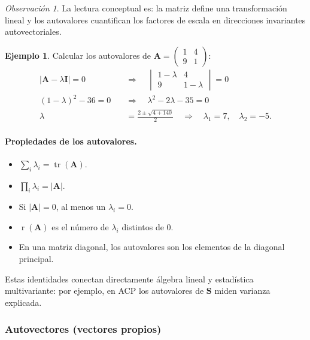 \documentclass[12pt, a4paper]{article}
\theoremstyle{plain}
\theoremstyle{definition}
\newtheorem{ejemplo}{Ejemplo}[section]
\theoremstyle{remark}
\newtheorem*{observacion}{Observación}
\newcommand{\mat}[1]{\mathbf{#1}}
\newcommand{\tr}{\operatorname{tr}}
\newcommand{\rg}{\operatorname{r}}
\begin{document}
\begin{observacion}
La lectura conceptual es: la matriz define una transformación lineal y los
autovalores cuantifican los factores de escala en direcciones invariantes
autovectoriales.
\end{observacion}

\begin{ejemplo}
Calcular los autovalores de $\mat{A} = \begin{pmatrix}1&4\\9&1\end{pmatrix}$:
\begin{align}
  |\mat{A}-\lambda\mat{I}| = 0 \quad&\Longrightarrow\quad
  \begin{vmatrix}1-\lambda & 4\\9 & 1-\lambda\end{vmatrix} = 0 \\
  (1-\lambda)^2 - 36 = 0 \quad&\Longrightarrow\quad \lambda^2 - 2\lambda - 35 = 0 \\
  \lambda &= \frac{2\pm\sqrt{4+140}}{2} \quad\Longrightarrow\quad
  \lambda_1 = 7,\quad \lambda_2 = -5.
\end{align}
\end{ejemplo}

\paragraph{Propiedades de los autovalores.}

\begin{mdframed}[style=resultado]
\begin{itemize}
  \item $\displaystyle\sum_i \lambda_i = \tr(\mat{A})$.
  \item $\displaystyle\prod_i \lambda_i = |\mat{A}|$.
  \item Si $|\mat{A}| = 0$, al menos un $\lambda_i = 0$.
  \item $\rg(\mat{A})$ es el número de $\lambda_i$ distintos de 0.
  \item En una matriz diagonal, los autovalores son los elementos de la diagonal principal.
\end{itemize}
\end{mdframed}

Estas identidades conectan directamente álgebra lineal y estadística
multivariante: por ejemplo, en ACP los autovalores de $\mat{S}$ miden varianza
explicada.

\subsubsection{Autovectores (vectores propios)}
\end{document}
